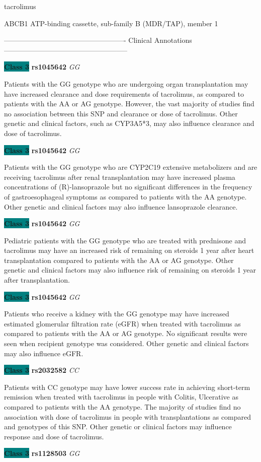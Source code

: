 \documentclass{resume} %
\begin{document}
\begin{rSection}{ tacrolimus }
\begin{rSubsection}{ ABCB1 }{ ATP-binding cassette, sub-family B (MDR/TAP), member 1 }{}{}
\item[] ---------------------------------------------------- Clinical Annotations -----------------------------------------------------\newline
\item \textbf{\colorbox{teal} {Class 3}} \textbf{ rs1045642 } \textit{ GG }
\item[] Patients with the GG genotype who are undergoing organ transplantation may have increased clearance and dose requirements of tacrolimus, as compared to patients with the AA or AG genotype. However, the vast majority of studies find no association between this SNP and clearance or dose of tacrolimus. Other genetic and clinical factors, such as CYP3A5*3, may also influence clearance and dose of tacrolimus. \item \textbf{\colorbox{teal} {Class 3}} \textbf{ rs1045642 } \textit{ GG }
\item[] Patients with the GG genotype who are CYP2C19 extensive metabolizers and are receiving tacrolimus after renal transplantation may have increased plasma concentrations of (R)-lansoprazole but no significant differences in the frequency of gastroesophageal symptoms as compared to patients with the AA genotype. Other genetic and clinical factors may also influence lansoprazole clearance.\item \textbf{\colorbox{teal} {Class 3}} \textbf{ rs1045642 } \textit{ GG }
\item[] Pediatric patients with the GG genotype who are treated with prednisone and tacrolimus may have an increased risk of remaining on steroids 1 year after heart transplantation compared to patients with the AA or AG genotype. Other genetic and clinical factors may also influence risk of remaining on steroids 1 year after transplantation.\item \textbf{\colorbox{teal} {Class 3}} \textbf{ rs1045642 } \textit{ GG }
\item[] Patients who receive a kidney with the GG genotype may have increased estimated glomerular filtration rate (eGFR) when treated with tacrolimus as compared to patients with the AA or AG genotype. No significant results were seen when recipient genotype was considered. Other genetic and clinical factors may also influence eGFR. \item \textbf{\colorbox{teal} {Class 3}} \textbf{ rs2032582 } \textit{ CC }
\item[] Patients with CC genotype may have lower success rate in achieving short-term remission when treated with tacrolimus in people with Colitis, Ulcerative as compared to patients with the AA genotype. The majority of studies find no association with dose of tacrolimus in people with transplantations as compared and genotypes of this SNP. Other genetic or clinical factors may influence response and dose of tacrolimus.\item \textbf{\colorbox{teal} {Class 3}} \textbf{ rs1128503 } \textit{ GG }

\end{rSubsection}
\end{rSection}
\end{document}

